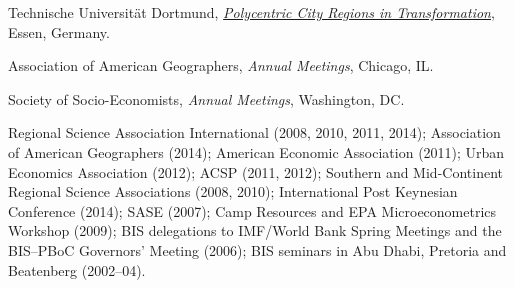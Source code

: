 \documentclass[letter,11pt]{article}
\newlength{\cvlabelw}
\newenvironment{cvlist}[1][2.5cm]{%
  \setlength{\cvlabelw}{#1}%
  \begin{list}{}{%
    \setlength{\leftmargin}{\cvlabelw}\setlength{\labelwidth}{\cvlabelw}%
    \setlength{\labelsep}{0pt}\setlength{\itemindent}{0pt}\setlength{\listparindent}{0pt}%
    \setlength{\itemsep}{4pt}\setlength{\parsep}{0pt}\setlength{\topsep}{3pt}\setlength{\partopsep}{0pt}%
    \renewcommand{\makelabel}[1]{##1\hfil}}}{\end{list}}
\begin{document}
\begin{cvlist}
Technische Universit\"{a}t Dortmund, \href{http://www.transforming-city-regions.com/}{\emph{Polycentric City Regions in Transformation}}, Essen, Germany.

Association of American Geographers, \emph{Annual Meetings}, Chicago, IL.

Society of Socio-Economists, \emph{Annual Meetings}, Washington, DC.
\item[2002 -- 2014] Regional Science Association International (2008, 2010, 2011, 2014); Association of American Geographers (2014); American Economic Association (2011); Urban Economics Association (2012); ACSP (2011, 2012); Southern and Mid-Continent Regional Science Associations (2008, 2010); International Post Keynesian Conference (2014); SASE (2007); Camp Resources and EPA Microeconometrics Workshop (2009); BIS delegations to IMF\slash World Bank Spring Meetings and the BIS--PBoC Governors' Meeting (2006); BIS seminars in Abu Dhabi, Pretoria and Beatenberg (2002--04).
\end{cvlist}
\end{document}
